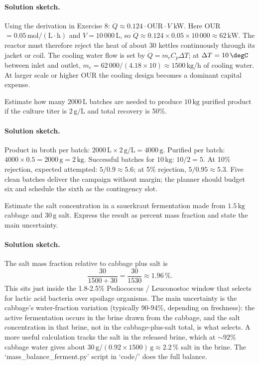 \paragraph{Solution sketch.}
Using the derivation in Exercise 8: $\dot Q \approx 0.124 \cdot
\text{OUR} \cdot V$ kW. Here OUR $= 0.05\,\text{mol}/(\text{L}\cdot\text{h})$
and $V = 10\,000\,\text{L}$, so $\dot Q \approx 0.124 \times 0.05
\times 10\,000 \approx 62\,\text{kW}$. The reactor must therefore
reject the heat of about $30$ kettles continuously through its jacket
or coil. The cooling water flow is set by $\dot Q = m_c C_p \Delta T$;
at $\Delta T = 10\,\degC$ between inlet and outlet,
$m_c = 62\,000 / (4.18 \times 10) \approx 1500\,\text{kg/h}$ of
cooling water. At larger scale or higher OUR the cooling design
becomes a dominant capital expense.

\begin{exercise}
Estimate how many $2000\,\text{L}$ batches are needed to produce
$10\,\text{kg}$ purified product if the culture titer is
$2\,\text{g}/\text{L}$ and total recovery is 50\%.
\end{exercise}

\paragraph{Solution sketch.}
Product in broth per batch: $2000\,\text{L} \times 2\,\text{g}/\text{L}
= 4000\,\text{g}$. Purified per batch: $4000 \times 0.5 = 2000\,\text{g}
= 2\,\text{kg}$. Successful batches for $10\,\text{kg}$:
$10/2 = 5$. At 10\% rejection, expected attempted: $5/0.9 \approx 5.6$;
at 5\% rejection, $5/0.95 \approx 5.3$. Five clean batches deliver
the campaign without margin; the planner should budget six and
schedule the sixth as the contingency slot.

\begin{exercise}
Estimate the salt concentration in a sauerkraut fermentation made from
$1.5\,\text{kg}$ cabbage and $30\,\text{g}$ salt. Express the result
as percent mass fraction and state the main uncertainty.
\end{exercise}

\paragraph{Solution sketch.}
The salt mass fraction relative to cabbage plus salt is
\[
\frac{30}{1500 + 30} = \frac{30}{1530} \approx 1.96\,\%.
\]
This sits just inside the 1.8-2.5\% Pediococcus / Leuconostoc window
that selects for lactic acid bacteria over spoilage organisms. The
main uncertainty is the cabbage's water-fraction variation (typically
90-94\%, depending on freshness): the active fermentation occurs in
the brine drawn from the cabbage, and the salt concentration in that
brine, not in the cabbage-plus-salt total, is what selects. A more
useful calculation tracks the salt in the released brine, which at
$\sim 92\%$ cabbage water gives about $30\,\text{g}/(0.92 \times
1500)\,\text{g} \approx 2.2\,\%$ salt in the brine. The
`mass_balance_ferment.py' script in `code/' does the full balance.

